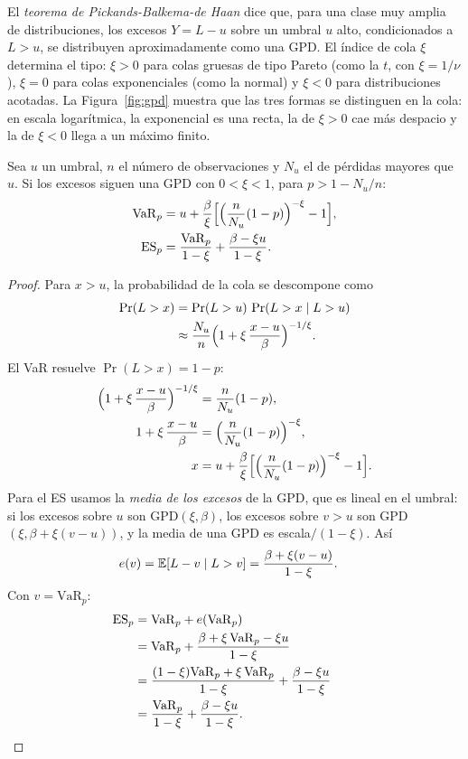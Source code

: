 El \emph{teorema de Pickands-Balkema-de Haan} dice que, para una clase muy amplia de distribuciones, los excesos
$Y=L-u$ sobre un umbral $u$ alto, condicionados a $L>u$, se distribuyen aproximadamente como una GPD. El índice de
cola $\xi$ determina el tipo: $\xi>0$ para colas gruesas de tipo Pareto (como la $t$, con $\xi=1/\nu$), $\xi=0$ para
colas exponenciales (como la normal) y $\xi<0$ para distribuciones acotadas. La Figura~\ref{fig:gpd} muestra que las
tres formas se distinguen en la cola: en escala logarítmica, la exponencial es una recta, la de $\xi>0$ cae más
despacio y la de $\xi<0$ llega a un máximo finito.

\begin{proposicion}\label{prop:gpdvar}
Sea $u$ un umbral, $n$ el número de observaciones y $N_u$ el de pérdidas mayores que $u$. Si los excesos siguen
una GPD con $0<\xi<1$, para $p>1-N_u/n$:
\begin{align*}
  \mathrm{VaR}_p &= u+\frac{\beta}{\xi}\Bigl[\Bigl(\frac{n}{N_u}(1-p)\Bigr)^{-\xi}-1\Bigr],\\
  \mathrm{ES}_p  &= \frac{\mathrm{VaR}_p}{1-\xi}+\frac{\beta-\xi u}{1-\xi}.
\end{align*}
\end{proposicion}

\begin{proof}
Para $x>u$, la probabilidad de la cola se descompone como
\begin{align*}
  \Pr(L>x) &= \Pr(L>u)\,\Pr(L>x\mid L>u)\\
           &\approx \frac{N_u}{n}\Bigl(1+\xi\,\frac{x-u}{\beta}\Bigr)^{-1/\xi}.
\end{align*}
El VaR resuelve $\Pr(L>x)=1-p$:
\begin{align*}
  \Bigl(1+\xi\,\frac{x-u}{\beta}\Bigr)^{-1/\xi} &= \frac{n}{N_u}(1-p),\\
  1+\xi\,\frac{x-u}{\beta} &= \Bigl(\frac{n}{N_u}(1-p)\Bigr)^{-\xi},\\
  x &= u+\frac\beta\xi\Bigl[\Bigl(\frac{n}{N_u}(1-p)\Bigr)^{-\xi}-1\Bigr].
\end{align*}
Para el ES usamos la \emph{media de los excesos} de la GPD, que es lineal en el umbral: si los excesos sobre $u$ son
GPD$(\xi,\beta)$, los excesos sobre $v>u$ son GPD$(\xi,\beta+\xi(v-u))$, y la media de una GPD es escala$/(1-\xi)$. Así
\begin{align*}
  e(v)=\mathbb{E}[L-v\mid L>v] &= \frac{\beta+\xi(v-u)}{1-\xi}.
\end{align*}
Con $v=\mathrm{VaR}_p$:
\begin{align*}
  \mathrm{ES}_p &= \mathrm{VaR}_p+e(\mathrm{VaR}_p)\\
                &= \mathrm{VaR}_p+\frac{\beta+\xi\,\mathrm{VaR}_p-\xi u}{1-\xi}\\
                &= \frac{(1-\xi)\mathrm{VaR}_p+\xi\,\mathrm{VaR}_p}{1-\xi}+\frac{\beta-\xi u}{1-\xi}\\
                &= \frac{\mathrm{VaR}_p}{1-\xi}+\frac{\beta-\xi u}{1-\xi}. && \qedhere
\end{align*}
\end{proof}

